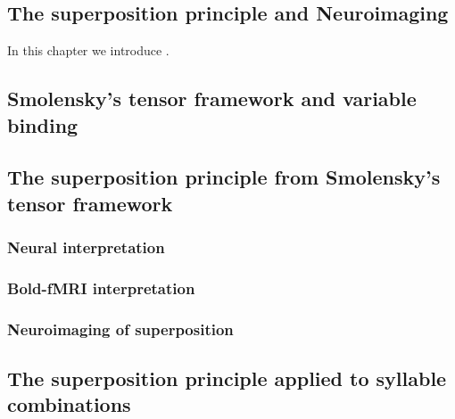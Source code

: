 \begin{fullwidth}
\chapter{\label{ch:super_intro}
The superposition principle and Neuroimaging}
\end{fullwidth}

\begin{chabstract}

In this chapter we introduce .

\end{chabstract}


\section{Smolensky's tensor framework and variable binding}


\section{The superposition principle from Smolensky's tensor framework}


\subsection{Neural interpretation}


\subsection{Bold-fMRI interpretation}


\subsection{Neuroimaging of superposition}


\section{The superposition principle applied to syllable combinations}

